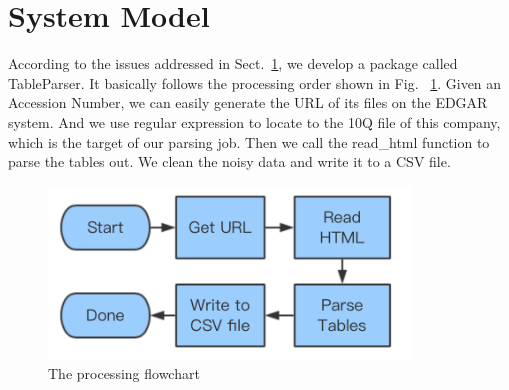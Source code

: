 \documentclass[conference]{IEEEtran}
\begin{document}
\section{System Model}\label{ii}
\indent According to the issues addressed in Sect.~\ref{ii}, we develop a package called TableParser. It basically follows the processing order shown in Fig. ~\ref{flowchart}. Given an Accession Number, we can easily generate the URL of its files on the EDGAR system. And we use regular expression to locate to the 10Q file of this company, which is the target of our parsing job. Then we call the read\_html function to parse the tables out. We clean the noisy data and write it to a CSV file.
\\
%
\begin{figure}
\centering
\includegraphics[width=3.8in]{flow1.png}
\caption{The processing flowchart}\label{flowchart}
\end{figure}
%
\end{document}
